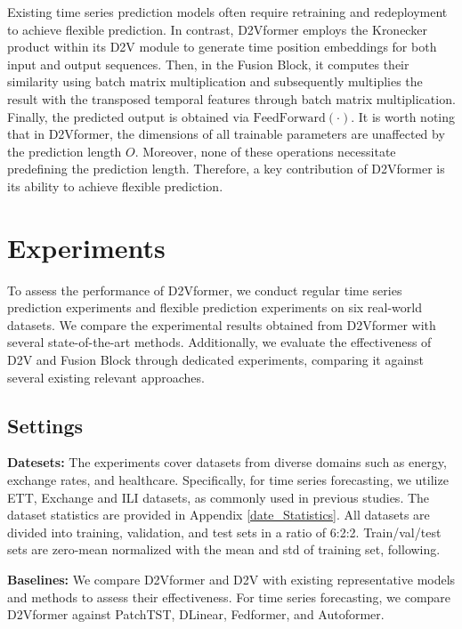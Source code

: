 \documentclass{article}
\begin{document}
Existing time series prediction models often require retraining and redeployment to achieve flexible prediction.
In contrast, D2Vformer employs the Kronecker product within its D2V module to generate time position embeddings for both input and output sequences. Then, in the Fusion Block, it computes their similarity using batch matrix multiplication and subsequently multiplies the result with the transposed temporal features through batch matrix multiplication. Finally, the predicted output is obtained via $\text{FeedForward}(\cdot)$. It is worth noting that 
in D2Vformer, the dimensions of all trainable parameters are unaffected by the prediction length $O$. Moreover, none of these operations necessitate predefining the prediction length. Therefore, a key contribution of D2Vformer is its ability to achieve flexible prediction.



\section{Experiments}
To assess the performance of D2Vformer, we conduct regular time series prediction experiments and flexible prediction experiments on six real-world datasets. We compare the experimental results obtained from D2Vformer with several state-of-the-art methods. Additionally, we evaluate the effectiveness of D2V and Fusion Block through dedicated experiments, comparing it against several existing relevant approaches.

\subsection{Settings}
\textbf{Datesets:} The experiments cover datasets from diverse domains such as energy, exchange rates, and healthcare. Specifically, for time series forecasting, we utilize ETT\cite{informer}, Exchange\cite{lstnet} and ILI\cite{autoformer} datasets, as commonly used in previous studies\cite{autoformer,fedformer,patchtst}. The dataset statistics are provided in Appendix \ref{date_Statistics}.
All datasets are divided into training, validation, and test sets in a ratio of 6:2:2. Train/val/test sets are zero-mean normalized with the mean and std of training set,
 following\cite{autoformer,dlinear,dateformer}.


\textbf{Baselines:} We compare D2Vformer and D2V with existing representative models and methods to assess their effectiveness. For time series forecasting, we compare D2Vformer against PatchTST\cite{patchtst}, DLinear\cite{dlinear}, Fedformer\cite{fedformer}, and Autoformer\cite{autoformer}. 
\end{document}
